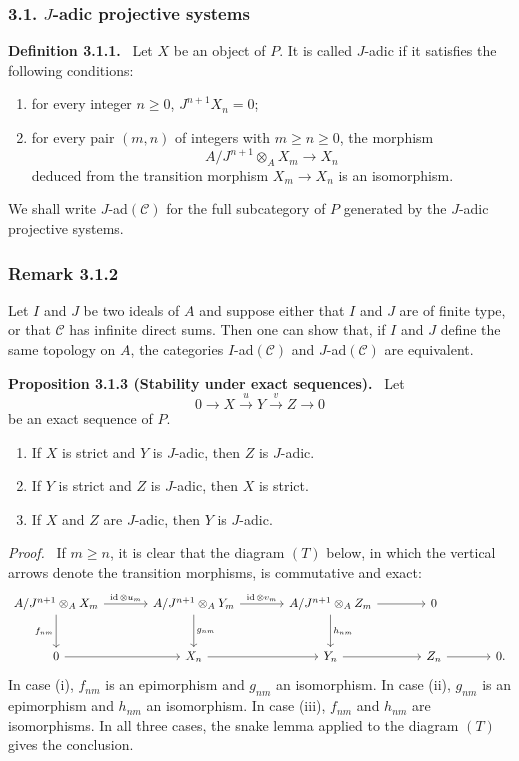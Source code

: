 \documentclass[11pt]{article}
\newenvironment{statement}[1]{\par\medskip\noindent\textbf{#1.}\ }{\par\medskip}
\newenvironment{prooftext}[1][Proof]{\par\noindent\emph{#1.}\ }{\par\medskip}
\providecommand{\id}{\operatorname{id}}
\providecommand{\cC}{\mathcal C}
\providecommand{\id}{\operatorname{id}}
\providecommand{\id}{\operatorname{id}}
\providecommand{\id}{\operatorname{id}}
\providecommand{\id}{\operatorname{id}}
\providecommand{\cC}{\mathcal C}
\begin{document}
\subsubsection*{3.1. $J$-adic projective systems}
\begin{statement}{Definition 3.1.1}
Let $X$ be an object of $P$. It is called $J$-adic if it satisfies the following conditions:
\begin{enumerate}[label=(\roman*)]
\item for every integer $n\ge0$, $J^{n+1}X_n=0$;
\item for every pair $(m,n)$ of integers with $m\ge n\ge0$, the morphism
\[
A/J^{n+1}\otimes_A X_m\longrightarrow X_n
\]
deduced from the transition morphism $X_m\to X_n$ is an isomorphism.
\end{enumerate}
\end{statement}
We shall write $J$-ad$(\cC)$ for the full subcategory of $P$ generated by the $J$-adic projective systems.

\subsubsection*{Remark 3.1.2}
Let $I$ and $J$ be two ideals of $A$ and suppose either that $I$ and $J$ are of finite type, or that $\cC$ has infinite direct sums. Then one can show that, if $I$ and $J$ define the same topology on $A$, the categories $I$-ad$(\cC)$ and $J$-ad$(\cC)$ are equivalent.

\begin{statement}{Proposition 3.1.3 (Stability under exact sequences)}
Let
\[
0\longrightarrow X\stackrel{u}{\longrightarrow}Y\stackrel{v}{\longrightarrow}Z\longrightarrow0
\]
be an exact sequence of $P$.
\begin{enumerate}[label=(\roman*)]
\item If $X$ is strict and $Y$ is $J$-adic, then $Z$ is $J$-adic.
\item If $Y$ is strict and $Z$ is $J$-adic, then $X$ is strict.
\item If $X$ and $Z$ are $J$-adic, then $Y$ is $J$-adic.
\end{enumerate}
\end{statement}

\begin{prooftext}[Proof]
If $m\ge n$, it is clear that the diagram $(T)$ below, in which the vertical arrows denote the transition morphisms, is commutative and exact:
\[
\begin{tikzcd}[column sep=large,row sep=large]
A/J^{n+1}\otimes_A X_m \arrow[r,"\id\otimes u_m"] \arrow[d,"f_{nm}"'] & A/J^{n+1}\otimes_A Y_m \arrow[r,"\id\otimes v_m"] \arrow[d,"g_{nm}"] & A/J^{n+1}\otimes_A Z_m \arrow[r] \arrow[d,"h_{nm}"] & 0\\
0 \arrow[r] & X_n \arrow[r] & Y_n \arrow[r] & Z_n \arrow[r] & 0 .
\end{tikzcd}
\]
In case (i), $f_{nm}$ is an epimorphism and $g_{nm}$ an isomorphism. In case (ii), $g_{nm}$ is an epimorphism and $h_{nm}$ an isomorphism. In case (iii), $f_{nm}$ and $h_{nm}$ are isomorphisms. In all three cases, the snake lemma applied to the diagram $(T)$ gives the conclusion.
\end{prooftext}
\end{document}
